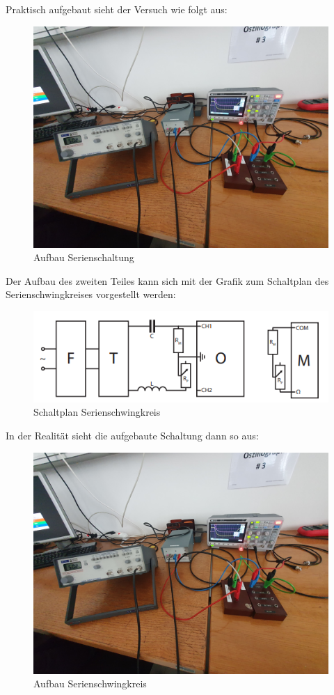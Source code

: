 \documentclass[12pt,a4paper,twoside]{article}
\begin{document}
\noindent
Praktisch aufgebaut sieht der Versuch wie folgt aus:

\begin{figure}[H]
    \centering
    \includegraphics[width=0.6\linewidth, angle=0]{nudes/Aufbau Serienschaltung.jpg}
    \caption{Aufbau Serienschaltung}
    \label{fig:Aufbau Serienschaltung}
\end{figure} 

\noindent
Der Aufbau des zweiten Teiles kann sich mit der Grafik zum Schaltplan des Serienschwingkreises vorgestellt werden:

\begin{figure}[H]
    \centering
    \includegraphics[width=0.6\linewidth, angle=0]{nudes/3.3 Serienschwingkreis.png}
    \caption{Schaltplan Serienschwingkreis}
    \label{fig:Schaltplan Serienschwingkreis}
\end{figure}

\noindent
In der Realität sieht die aufgebaute Schaltung dann so aus:

\begin{figure}[H]
    \centering
    \includegraphics[width=0.6\linewidth, angle=0]{nudes/Aufbau Serienschaltung.jpg}
    \caption{Aufbau Serienschwingkreis}
    \label{fig:Aufbau Serienschwingkreis}
\end{figure} 
\end{document}
